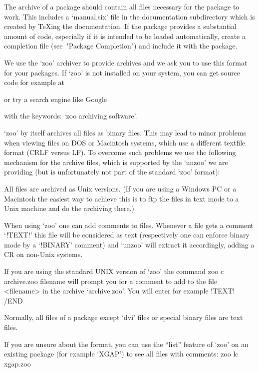 The archive of a {\GAP} package should contain all files necessary for the
package to work. This includes a `manual.six' file in the
documentation subdirectory which is created by {\TeX}ing the documentation.
If the package provides a substantial amount of code,
especially if it is intended to be loaded automatically, create a completion
file (see~"Package Completion") and include it with the package.

We use the `zoo' archiver to provide {\GAP} archives and we ask you to
use this format for your {\GAP} packages. If `zoo' is not installed on your
system, you can get source code for example at

or try a search engine like Google

with the keywords: `zoo archiving software'.

`zoo' by itself archives all files as binary files. This may lead to minor
problems when viewing files on DOS or Macintosh systems, which use a
different textfile format (CRLF versus LF). To overcome such problems we use
the following mechanism for the {\GAP} archive files, which is supported by
the `unzoo' we are providing (but is unfortunately not part of the standard
`zoo' format):

All files are archived as Unix versions. (If you are using a Windows PC or a
Macintosh the easiest way to achieve this is to ftp the files in text mode
to a Unix machine and do the archiving there.)

When using `zoo' one can add comments to files. Whenever a file gets a comment
`!TEXT!' this file  will be considered as text (respectively one can enforce
binary mode by a `!BINARY' comment) and `unzoo' will extract it accordingly,
adding a CR on non-Unix systems.

If you are using the standard UNIX version of `zoo' the command
\begintt
zoo c archive.zoo filename
\endtt
will prompt you for a comment to add to the file <filename> in the archive
`archive.zoo'. You will enter for example
\begintt
!TEXT!
/END
\endtt

Normally, all files of a {\GAP} package except `dvi' files or special binary
files are text files.

If you are unsure about the format, you can use the ``list'' feature of
`zoo' on an existing package (for example `XGAP') to see all files with
comments:
\begintt 
zoo lc xgap.zoo
\endtt 


